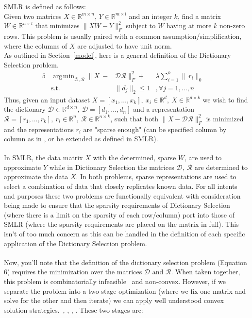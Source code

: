 \documentclass{article}
\newcommand{\R}{\mathbb{R}}
\DeclareMathOperator*{\argmin}{\arg\!\min}
\begin{document}
SMLR is defined as follows:\\
Given two matrices $X\in\R^{m\times n}$, $Y\in\R^{m\times l}$ and an integer $k$, find a matrix  $W\in\R^{n\times l}$ that minimizes $\|XW-Y\|^2_F$ subject to $W$ having at more $k$ non-zero rows. This problem is usually paired with a common assumption/simplification, where the columns of $X$ are adjusted to have unit norm.
\\

As outlined in Section~\ref{model}, here is a general definition of the Dictionary Selection problem.
\begin{alignat}{5}
         & \argmin_{\mathcal{D}, \mathcal{R}} \|X \ -&\mathcal{D}\mathcal{R}\|_F^2  + &\lambda \sum_{i=1}^k  \|\ r_i\|_0     \quad   \\
         &\text{s.t.}  \quad  &\|d_j\|_2 \leq 1&, \forall j=1, ...,n  \quad 
\end{alignat}
Thus, given an input dataset $X=[x_1, \dots, x_k], \ x_i\in\R^d, \ X\in\R^{d\times k}$ we wish to find the dictionary $\mathcal{D}\in\R^{d\times n}, \ \mathcal{D} = [d_1, \dots, d_n]$ and a representation $\mathcal{R}=[r_1,\dots,r_k], \ r_i\in\R^n, \ \mathcal{R}\in\R^{n\times k}$, such that both $\|X-\mathcal{D}\mathcal{R}\|_F^2$ is minimized and the representations $r_i$ are "sparse enough" (can be specified column by column as in \cite{rIBP}, or be extended as defined in SMLR).\\
\\
\noindent In SMLR, the data matrix $X$ with the determined, sparse $W$, are used to approximate $Y$ while in Dictionary Selection the matrices $\mathcal{D},\ \mathcal{R}$ are determined to approximate the data $X$. In both problems, sparse representations are used to select a combination of data that closely replicates known data. For all intents and purposes these two problems are functionally equivalent with consideration being made to ensure that the sparsity requirements of Dictionary Selection (where there is a limit on the sparsity of each row/column) port into those of SMLR (where the sparsity requirements are placed on the matrix in full). This isn't of too much concern as this can be handled in the definition of each specific application of the Dictionary Selection problem.\\
\\
Now, you'll note that the definition of the dictionary selection problem (Equation 6) requires the minimization over the matrices $\mathcal{D}\text{ and }\mathcal{R}$. When taken together, this problem is combinatorially infeasible~\cite{NPHardproof} and non-convex. However, if we separate the problem into a two-stage optimization (where we fix one matrix and solve for the other and then iterate) we can apply well understood convex solution strategies.~\cite{submod_spectral}, \cite{greedy_selection}, \cite{rIBP}, \cite{Singer16TwoStage}. These two stages are: 
\end{document}
